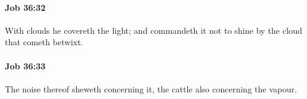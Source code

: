 		\paragraph{Job 36:32} %
			\label{JOB-36-32}

			With clouds he covereth the light; and commandeth it not to shine by the cloud that cometh betwixt.


		\paragraph{Job 36:33} %
			\label{JOB-36-33}

			The noise thereof sheweth concerning it, the cattle also concerning the vapour.

